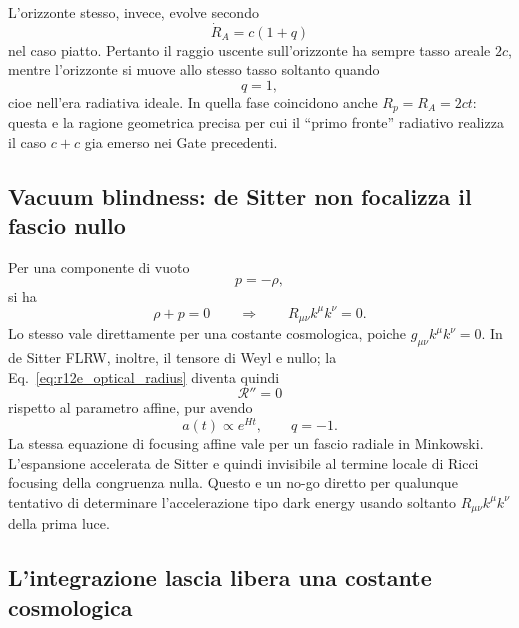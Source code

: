 \documentclass[11pt,a4paper]{article}
\begin{document}
L'orizzonte stesso, invece, evolve secondo
\begin{equation}
 \dot R_A=c(1+q)
 \label{eq:r12e_RA_rate}
\end{equation}
nel caso piatto. Pertanto il raggio uscente sull'orizzonte ha sempre tasso areale $2c$, mentre l'orizzonte si muove allo stesso tasso soltanto quando
\begin{equation}
 q=1,
\end{equation}
cioe nell'era radiativa ideale. In quella fase coincidono anche $R_p=R_A=2ct$: questa e la ragione geometrica precisa per cui il ``primo fronte'' radiativo realizza il caso $c+c$ gia emerso nei Gate precedenti.

\subsection{Vacuum blindness: de Sitter non focalizza il fascio nullo}

Per una componente di vuoto
\begin{equation}
 p=-\rho,
\end{equation}
si ha
\begin{equation}
 \rho+p=0
 \qquad\Longrightarrow\qquad
 R_{\mu\nu}k^\mu k^\nu=0.
\end{equation}
Lo stesso vale direttamente per una costante cosmologica, poiche $g_{\mu\nu}k^\mu k^\nu=0$. In de Sitter FLRW, inoltre, il tensore di Weyl e nullo; la Eq.~\eqref{eq:r12e_optical_radius} diventa quindi
\begin{equation}
 \boxed{\mathcal R''=0}
 \label{eq:r12e_desitter_affine}
\end{equation}
rispetto al parametro affine, pur avendo
\begin{equation}
 a(t)\propto e^{Ht},\qquad q=-1.
\end{equation}
La stessa equazione di focusing affine vale per un fascio radiale in Minkowski. L'espansione accelerata de Sitter e quindi invisibile al termine locale di Ricci focusing della congruenza nulla. Questo e un no-go diretto per qualunque tentativo di determinare l'accelerazione tipo dark energy usando soltanto $R_{\mu\nu}k^\mu k^\nu$ della prima luce.

\subsection{L'integrazione lascia libera una costante cosmologica}
\end{document}

